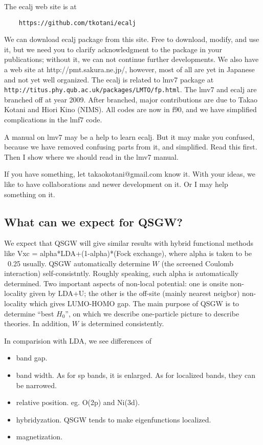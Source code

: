 \documentclass[a4paper,10pt,epsf,fleqn]{article}
\begin{document}
The ecalj web site is at 
\begin{verbatim}
    https://github.com/tkotani/ecalj
\end{verbatim}
We can download ecalj package from this site.
Free to download, modify, and use it, but we need you to clarify 
acknowledgment to the package in your publications; 
without it, we can not continue further developments.
We also have a web site at http://pmt.sakura.ne.jp/, 
however, most of all are yet in Japanese and not yet well organized.
The ecalj is related to lmv7 package at\\
\verb+http://titus.phy.qub.ac.uk/packages/LMTO/fp.html+. 
The lmv7 and ecalj are branched off at year 2009.
After branched, major contributions are due to Takao Kotani and Hiori
Kino (NIMS). All codes are now in f90, and we have simplified 
complications in the lmf7 code. 

A manual on lmv7 may be a help to learn ecalj. 
But it may make you confused, because we have removed confusing
parts from it, and simplified. Read this first. Then I show where we
should read in the lmv7 manual.

If you have something, let takaokotani@gmail.com know it.
With your ideas, we like to have collaborations and newer development on
it. Or I may help something on it.

\subsection{What can we expect for QSGW?}
We expect that QSGW will give similar results with hybrid functional methods 
like Vxc = alpha*LDA+(1-alpha)*(Fock exchange), where alpha is taken to
be ~0.25 usually. QSGW automatically determine $W$ 
(the screened Coulomb interaction) self-consistntly. 
Roughly speaking, such alpha is automatically determined.
Two important aspects of non-local potential:
one is onsite non-locality given by LDA+U; the other is
the off-site (mainly nearest neigbor) non-locality which gives 
LUMO-HOMO gap. The main purpose of QSGW is to determine ``best $H_0$'', 
on which we describe one-particle picture to describe theories.
In addition, $W$ is determined consistently.

In comparision with LDA, we see differences of
\begin{itemize}
\item
band gap.
\item
band width. As for sp bands, it is enlarged.
As for localized bands, they can be narrowed.
\item
relative position. eg. O(2p) and Ni(3d).
\item
hybridyzation.
QSGW tends to make eigenfunctions localized.
\item
magnetization.
\end{itemize}
\end{document}
